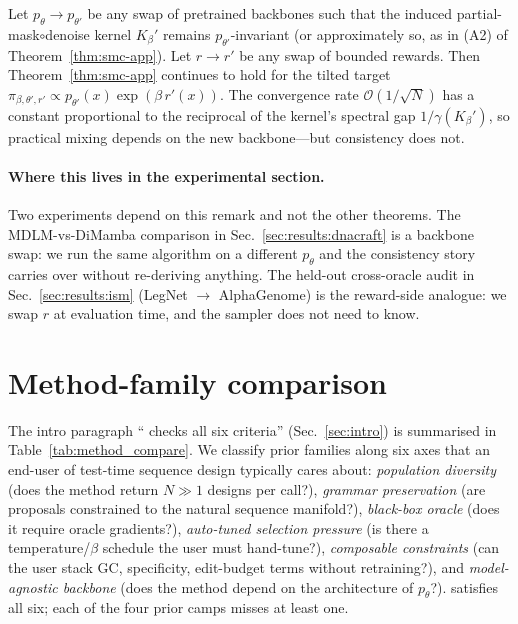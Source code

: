 \begin{remark}
Let $p_\theta\!\to\!p_{\theta'}$ be any swap of pretrained backbones such that the induced partial-mask$\circ$denoise kernel $K_{\beta}'$ remains $p_{\theta'}$-invariant (or approximately so, as in (A2) of Theorem~\ref{thm:smc-app}). Let $r\!\to\!r'$ be any swap of bounded rewards. Then Theorem~\ref{thm:smc-app} continues to hold for the tilted target $\pi_{\beta,\theta',r'}\propto p_{\theta'}(x)\exp(\beta\,r'(x))$. The convergence rate $\mathcal{O}(1/\sqrt{N})$ has a constant proportional to the reciprocal of the kernel's spectral gap $1/\gamma(K_\beta')$, so practical mixing depends on the new backbone---but consistency does not.
\end{remark}

\paragraph{Where this lives in the experimental section.}
Two experiments depend on this remark and not the other theorems. The MDLM-vs-DiMamba comparison in Sec.~\ref{sec:results:dnacraft} is a backbone swap: we run the same algorithm on a different $p_\theta$ and the consistency story carries over without re-deriving anything. The held-out cross-oracle audit in Sec.~\ref{sec:results:ism} (LegNet $\!\to\!$ AlphaGenome) is the reward-side analogue: we swap $r$ at evaluation time, and the sampler does not need to know.

\section{Method-family comparison}\label{app:method_compare}

The intro paragraph ``\gpa{} checks all six criteria'' (Sec.~\ref{sec:intro}) is summarised in Table~\ref{tab:method_compare}. We classify prior families along six axes that an end-user of test-time sequence design typically cares about: \emph{population diversity} (does the method return $N\!\gg\!1$ designs per call?), \emph{grammar preservation} (are proposals constrained to the natural sequence manifold?), \emph{black-box oracle} (does it require oracle gradients?), \emph{auto-tuned selection pressure} (is there a temperature/$\beta$ schedule the user must hand-tune?), \emph{composable constraints} (can the user stack GC, specificity, edit-budget terms without retraining?), and \emph{model-agnostic backbone} (does the method depend on the architecture of $p_\theta$?). \gpa{} satisfies all six; each of the four prior camps misses at least one.

